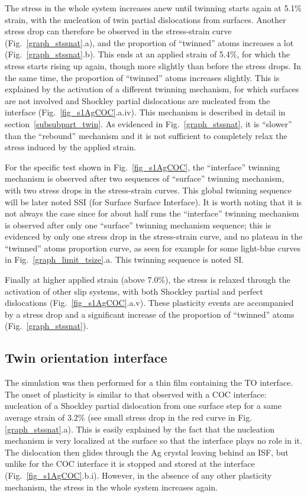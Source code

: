 \documentclass[final,3p,times,twocolumn]{elsarticle}
\begin{document}
The stress in the whole system increases anew until twinning starts again at 5.1\% strain, with the nucleation of twin partial dislocations from surfaces. Another stress drop can therefore be observed in the stress-strain curve (Fig.~\ref{graph_stssnat}.a), and the proportion of ``twinned'' atoms increases a lot (Fig.~\ref{graph_stssnat}.b). This ends at an applied strain of 5.4\%, for which the stress starts rising up again, though more slightly than before the stress drops. In the same time, the proportion of ``twinned'' atoms increases slightly. This is explained by the activation of a different twinning mechanism, for which surfaces are not involved and Shockley partial dislocations are nucleated from the interface (Fig.~\ref{fig_s1AgCOC}.a.iv). This mechanism is described in detail in section~\ref{subsubpart_twin}. As evidenced in Fig.~\ref{graph_stssnat}, it is ``slower'' than the ``rebound'' mechanism and it is not sufficient to completely relax the stress induced by the applied strain.

For the specific test shown in Fig.~\ref{fig_s1AgCOC}, the ``interface'' twinning mechanism is observed after two sequences of ``surface'' twinning mechanism, with two stress drops in the stress-strain curves. This global twinning sequence will be later noted SSI (for Surface Surface Interface). It is worth noting that it is not always the case since for about half runs the ``interface'' twinning mechanism is observed after only one ``surface'' twinning mechanism sequence; this is evidenced by only one stress drop in the stress-strain curve, and no plateau in the ``twinned'' atoms proportion curve, as seen for example for some light-blue curves in Fig.~\ref{graph_limit_tsize}.a. This twinning sequence is noted SI.

Finally at higher applied strain (above 7.0\%), the stress is relaxed through the activation of other slip systems, with both Shockley partial and perfect dislocations (Fig.~\ref{fig_s1AgCOC}.a.v). These plasticity events are  accompanied by a stress drop and a significant increase of the proportion of ``twinned'' atoms (Fig.~\ref{graph_stssnat}).

	\subsection{Twin orientation interface}\label{subsubpart_sAg2}
	
The simulation was then performed for a thin film containing the TO interface. The onset of plasticity is similar to that observed with a COC interface: nucleation of a Shockley partial dislocation from one surface step for a same average strain of 3.2\% (see small stress drop in the red curve in Fig.\ref{graph_stssnat}.a). This is easily explained by the fact that the nucleation mechanism is very localized at the surface so that the interface plays no role in it. The dislocation then glides through the Ag crystal leaving behind an ISF, but unlike for the COC interface it is stopped and stored at the interface (Fig.~\ref{fig_s1AgCOC}.b.i). However, in the absence of any other plasticity mechanism, the stress in the whole system increases again.
\end{document}

